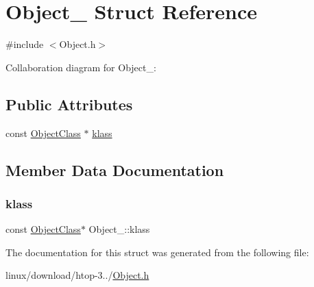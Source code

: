 \hypertarget{structObject__}{}\section{Object\+\_\+ Struct Reference}
\label{structObject__}


{\ttfamily \#include $<$Object.\+h$>$}



Collaboration diagram for Object\+\_\+\+:
\subsection*{Public Attributes}
\begin{DoxyCompactItemize}
\item 
const \hyperlink{Object_8h_a6feb151c3b8f61fae503dfbcdc3d6a54}{Object\+Class} $\ast$ \hyperlink{structObject___a59304b37b1abe4913627643cee2fcaf4}{klass}
\end{DoxyCompactItemize}


\subsection{Member Data Documentation}
\mbox{\label{structObject___a59304b37b1abe4913627643cee2fcaf4}} 
\subsubsection{\texorpdfstring{klass}{klass}}
{\footnotesize\ttfamily const \hyperlink{Object_8h_a6feb151c3b8f61fae503dfbcdc3d6a54}{Object\+Class}$\ast$ Object\+\_\+\+::klass}



The documentation for this struct was generated from the following file\+:\begin{DoxyCompactItemize}
\item 
linux/download/htop-\/3../\hyperlink{Object_8h}{Object.\+h}\end{DoxyCompactItemize}
